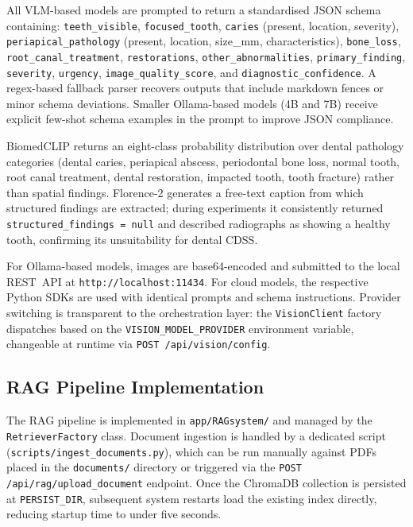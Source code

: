 \documentclass[12pt,a4paper]{report}
\begin{document}
All VLM-based models are prompted to return a standardised JSON schema
containing: \texttt{teeth\_visible}, \texttt{focused\_tooth},
\texttt{caries} (present, location, severity),
\texttt{periapical\_pathology} (present, location, size\_mm,
characteristics), \texttt{bone\_loss}, \texttt{root\_canal\_treatment},
\texttt{restorations}, \texttt{other\_abnormalities},
\texttt{primary\_finding}, \texttt{severity}, \texttt{urgency},
\texttt{image\_quality\_score}, and \texttt{diagnostic\_confidence}.  A
regex-based fallback parser recovers outputs that include markdown fences
or minor schema deviations.  Smaller Ollama-based models (4B and 7B)
receive explicit few-shot schema examples in the prompt to improve JSON
compliance.

BiomedCLIP returns an eight-class probability distribution over dental
pathology categories (dental caries, periapical abscess, periodontal
bone loss, normal tooth, root canal treatment, dental restoration,
impacted tooth, tooth fracture) rather than spatial findings.
Florence-2 generates a free-text caption from which structured findings
are extracted; during experiments it consistently returned
\texttt{structured\_findings~= null} and described radiographs as showing
a healthy tooth, confirming its unsuitability for dental CDSS.

For Ollama-based models, images are base64-encoded and submitted to the
local REST~API at \texttt{http://localhost:11434}.  For cloud models,
the respective Python SDKs are used with identical prompts and schema
instructions.  Provider switching is transparent to the orchestration
layer: the \texttt{VisionClient} factory dispatches based on the
\texttt{VISION\_MODEL\_PROVIDER} environment variable, changeable at
runtime via \texttt{POST /api/vision/config}.

\subsection{RAG Pipeline Implementation}
\label{subsec:rag_impl}

The RAG pipeline is implemented in \texttt{app/RAGsystem/} and managed
by the \texttt{RetrieverFactory} class.  Document ingestion is handled
by a dedicated script (\texttt{scripts/ingest\_documents.py}), which
can be run manually against PDFs placed in the \texttt{documents/}
directory or triggered via the \texttt{POST /api/rag/upload\_document}
endpoint.  Once the ChromaDB collection is persisted at
\texttt{PERSIST\_DIR}, subsequent system restarts load the existing
index directly, reducing startup time to under five seconds.
\end{document}
